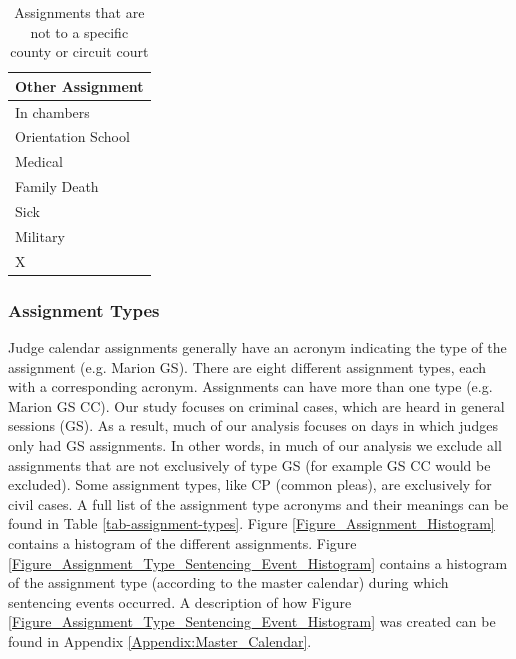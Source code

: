 \documentclass[11pt, oneside]{article}   	%
\theoremstyle{ModifiedStyle}
\begin{document}
      \begin{table}[H]
        \centering
        \caption{Assignments that are not to a specific county or circuit court}
        \label{tab-special-assignments}
        \begin{tabular}{l}
        \hline
        \textbf{Other Assignment}                      \\ \hline
        In chambers        \\
        Orientation School \\
        Medical            \\
        Family Death       \\
        Sick              \\
        Military           \\
        X                  \\ \hline
        \end{tabular}
      \end{table}

    \subsubsection{Assignment Types}
      Judge calendar assignments generally have an acronym indicating the type of the assignment (e.g. Marion GS). There are eight different assignment types, each with a corresponding acronym. Assignments can have more than one type (e.g. Marion GS CC). Our study focuses on criminal cases, which are heard in general sessions (GS). As a result, much of our analysis focuses on days in which judges only had GS assignments. In other words, in much of our analysis we exclude all assignments that are not exclusively of type GS (for example GS CC would be excluded). Some assignment types, like CP (common pleas), are exclusively for civil cases. A full list of the assignment type acronyms and their meanings can be found in Table \ref{tab-assignment-types}. Figure \ref{Figure_Assignment_Histogram} contains a histogram of the different assignments. Figure \ref{Figure_Assignment_Type_Sentencing_Event_Histogram} contains a histogram of the assignment type (according to the master calendar) during which sentencing events occurred. A description of how Figure \ref{Figure_Assignment_Type_Sentencing_Event_Histogram} was created can be found in Appendix \ref{Appendix:Master_Calendar}.
\end{document}
